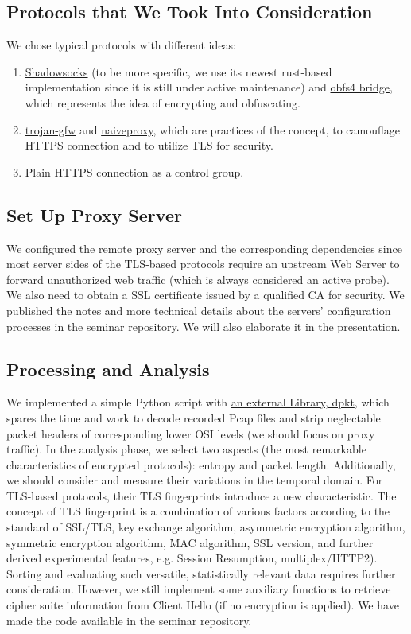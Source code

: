\documentclass[conference]{IEEEtran}
\begin{document}
\subsection{Protocols that We Took Into Consideration}\label{AA}
We chose typical protocols with different ideas:
\begin{enumerate}
    \item \href{https://shadowsocks.org}{Shadowsocks} (to be more specific, we use its newest rust-based implementation since it is still under active maintenance) and \href{https://gitlab.com/yawning/obfs4}{obfs4 bridge}, which represents the idea of encrypting and obfuscating.
    \item \href{https://trojan-gfw.github.io/trojan/}{trojan-gfw} and \href{https://github.com/klzgrad/naiveproxy}{naiveproxy}, which are practices of the concept, to camouflage HTTPS connection and to utilize TLS for security.
    \item Plain HTTPS connection as a control group.
\end{enumerate}

\subsection{Set Up Proxy Server}
We configured the remote proxy server and the corresponding dependencies since most server sides of the TLS-based protocols require an upstream Web Server to forward unauthorized web traffic (which is always considered an active probe). We also need to obtain a SSL certificate issued by a qualified CA for security.
We published the notes and more technical details about the servers' configuration processes in the seminar repository. We will also elaborate it in the presentation.

\subsection{Processing and Analysis }
We implemented a simple Python script with \href{https://dpkt.readthedocs.io/en/latest/}{an external Library, dpkt}, which spares the time and work to decode recorded Pcap files and strip neglectable packet headers of corresponding lower OSI levels (we should focus on proxy traffic).
In the analysis phase, we select two aspects (the most remarkable characteristics of encrypted protocols): entropy and packet length. Additionally, we should consider and measure their variations in the temporal domain.
For TLS-based protocols, their TLS fingerprints introduce a new characteristic. The concept of TLS fingerprint is a combination of various factors according to the standard of SSL/TLS, key exchange algorithm, asymmetric encryption algorithm, symmetric encryption algorithm, MAC algorithm, SSL version, and further derived experimental features, e.g. Session Resumption, multiplex/HTTP2).
Sorting and evaluating such versatile, statistically relevant data requires further consideration. However, we still implement some auxiliary functions to retrieve cipher suite information from Client Hello (if no encryption is applied).
We have made the code available in the seminar repository.
\end{document}

